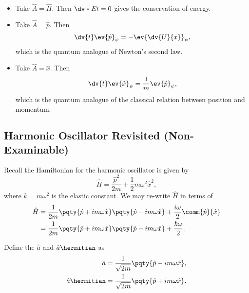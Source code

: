 \begin{example}
    \begin{itemize}
        \item Take \(\hat{A} = \hat{H}\). Then \(\dv*{E}{t} = 0\) gives the conservation of energy.
        \item Take \(\hat{A} = \hat{p}\). Then
        \begin{equation}
            \dv{t} \ev{\hat{p}}_\psi = - \ev{\dv{U}{x}}_\psi,
        \end{equation}
        which is the quantum analogue of Newton's second law.
        \item Take \(\hat{A} = \hat{x}\). Then
        \begin{equation}
            \dv{t} \ev{\hat{x}}_\psi = \frac{1}{m} \ev{\hat{p}}_\psi,
        \end{equation}
        which is the quantum analogue of the classical relation between position and momentum.
    \end{itemize}
\end{example}

\subsection{Harmonic Oscillator Revisited (Non-Examinable)}

Recall the Hamiltonian for the harmonic oscillator is given by
\begin{equation}
    \hat{H} = \frac{\hat{p}^2}{2m} + \frac{1}{2} m \omega^2 \hat{x}^2,
\end{equation}
where \(k = m \omega^2\) is the elastic constant. We may re-write \(\hat{H}\) in terms of
\begin{subequations}
    \begin{align}
        \hat{H} &= \frac{1}{2m} \pqty{\hat{p} + i m \omega \hat{x}} \pqty{\hat{p} - i m \omega \hat{x}} + \frac{i \omega}{2} \comm{\hat{p}}{\hat{x}} \\
        &= \frac{1}{2m} \pqty{\hat{p} + i m \omega \hat{x}} \pqty{\hat{p} - i m \omega \hat{x}} + \frac{\hbar \omega}{2}.
    \end{align}
\end{subequations}

\begin{definition}
    Define the  \(\hat{a}\) and \(\hat{a}\hermitian\) as
    \begin{subequations}
        \begin{align}
            \hat{a} &= \frac{1}{\sqrt{2m}} \pqty{\hat{p} - i m \omega \hat{x}}, \\
            \hat{a}\hermitian &= \frac{1}{\sqrt{2m}} \pqty{\hat{p} + i m \omega \hat{x}}.
        \end{align}
    \end{subequations}
\end{definition}

